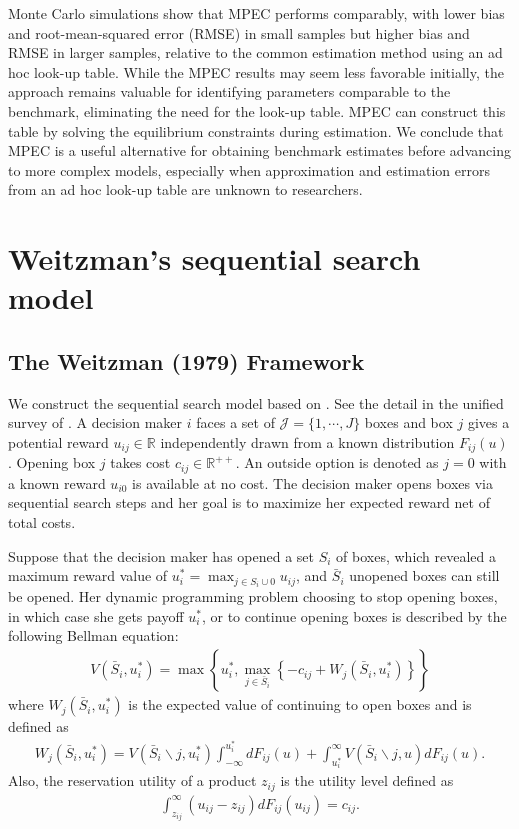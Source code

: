 \documentclass[12pt]{article}
\begin{document}
Monte Carlo simulations show that MPEC performs comparably, with lower bias and root-mean-squared error (RMSE) in small samples but higher bias and RMSE in larger samples, relative to the common estimation method using an ad hoc look-up table. While the MPEC results may seem less favorable initially, the approach remains valuable for identifying parameters comparable to the benchmark, eliminating the need for the look-up table. MPEC can construct this table by solving the equilibrium constraints during estimation. We conclude that MPEC is a useful alternative for obtaining benchmark estimates before advancing to more complex models, especially when approximation and estimation errors from an ad hoc look-up table are unknown to researchers.




\section{Weitzman's sequential search model}

\subsection{The Weitzman (1979) Framework}
We construct the sequential search model based on \cite{weitzman1979optimal}.
See the detail in the unified survey of \cite{ursu2023sequential}. 
A decision maker $i$ faces a set of $\mathcal{J}=\{1,\cdots,J\}$ boxes and box $j$ gives a potential reward $u_{ij}\in \mathbb{R}$ independently drawn from a known
distribution $F_{ij}(u)$.
Opening box $j$ takes cost $c_{ij}\in \mathbb{R}^{++}$. 
An outside option is denoted as $j = 0$ with a known reward $u_{i0}$ is available at no cost.
The decision maker
opens boxes via sequential search steps and her goal is to maximize her expected reward net of total costs.

Suppose that the decision maker has opened a set \(S_{i}\) of boxes,
which revealed a maximum reward value of \(u_{i}^{*}=\max _{j \in S_{i} \cup 0} u_{i j}\), and \(\bar{S}_{i}\) unopened boxes can still be
opened. 
Her dynamic programming problem choosing to stop opening boxes, in which case she
gets payoff \(u_{i}^{*}\), or to continue opening boxes is described
by the following Bellman equation:
\begin{align}
    V\left(\bar{S}_{i}, u_{i}^{*}\right)=\max \left\{u_{i}^{*}, \max _{j \in \bar{S}_{i}}\left\{-c_{i j}+W_{j}\left(\bar{S}_{i}, u_{i}^{*}\right)\right\}\right\}
\end{align}
where \(W_{j}\left(\bar{S}_{i}, u_{i}^{*}\right)\) is the expected value of continuing to open boxes and is
defined as
\begin{align}
    W_{j}\left(\bar{S}_{i}, u_{i}^{*}\right)=V\left(\bar{S}_{i} \backslash j, u_{i}^{*}\right) \int_{-\infty}^{u_{i}^{*}} d F_{i j}(u)+\int_{u_{i}^{*}}^{\infty} V\left(\bar{S}_{i} \backslash j, u\right) d F_{i j}(u).
\end{align}
Also, the reservation utility of a product \(z_{i j}\) is the utility level defined as 
\begin{align}
    \int_{z_{i j}}^{\infty}\left(u_{i j}-z_{i j}\right) d F_{i j}\left(u_{i j}\right)=c_{i j}.
\end{align}
\end{document}
